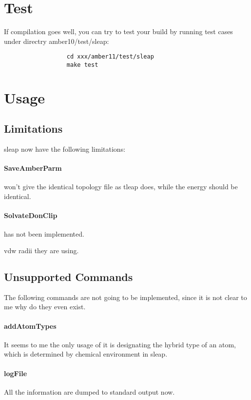 \documentclass[letterpaper]{article}
\begin{document}
\section{Test}

\paragraph*{}
   If compilation goes well, you can try to test your build by running test cases under directry amber10/test/sleap:
\begin{lstlisting}
                  cd xxx/amber11/test/sleap
                  make test
\end{lstlisting}
   

\section{Usage}

\subsection{Limitations}
  sleap now have the following limitations:

\paragraph{SaveAmberParm} won't give the identical topology file as tleap does, while the energy 
should be identical.

\paragraph{SolvateDonClip} has not been implemented.

vdw radii they are using.


\subsection{Unsupported Commands}
  The following commands are not going to be implemented, since it is not clear to me why do
they even exist.

\paragraph*{addAtomTypes} It seems to me the only usage of it is designating the hybrid type of 
an atom, which is determined by chemical environment in sleap.

 
\paragraph*{logFile} All the information are dumped to standard output now.
\end{document}
